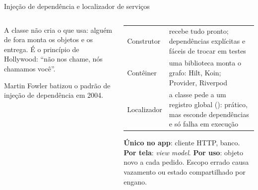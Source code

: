 \begin{frame}{Injeção de dependência e localizador de serviços}
  \begin{columns}[T]
    \begin{column}{0.5\textwidth}
      \begin{definicao}
        A classe não cria o que usa: alguém de fora monta os objetos e os entrega. É o princípio de Hollywood: ``não nos chame, nós chamamos você''.
      \end{definicao}
      \centering
      \raggedright
      \begin{historia}
        Martin Fowler batizou o padrão de injeção de dependência em 2004.
      \end{historia}
    \end{column}
    \begin{column}{0.48\textwidth}
      \scriptsize
      \begin{tabularx}{\linewidth}{@{}l L@{}}
        \toprule
         &  \\
        \midrule
        Construtor & recebe tudo pronto; dependências explícitas e fáceis de trocar em testes \\
        Contêiner & uma biblioteca monta o grafo: Hilt, Koin; Provider, Riverpod \\
        Localizador & a classe pede a um registro global (): prático, mas esconde dependências e só falha em execução \\
        \bottomrule
      \end{tabularx}
      \normalsize
      \begin{pordentro}
        \textbf{Único no app}: cliente HTTP, banco. \textbf{Por tela}: \emph{view model}. \textbf{Por uso}: objeto novo a cada pedido. Escopo errado causa vazamento ou estado compartilhado por engano.
      \end{pordentro}
    \end{column}
  \end{columns}
\end{frame}

